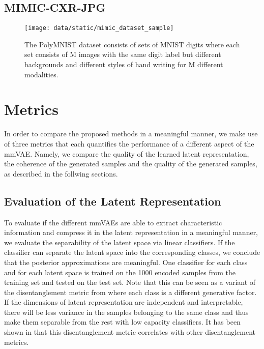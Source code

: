 \subsection{MIMIC-CXR-JPG}

\begin{figure}[h!]
    \centering
    \texttt{[image: data/static/mimic\_dataset\_sample]}
    \caption{The PolyMNIST dataset consists of sets of MNIST
    digits where each set consists of M images
    with the same digit label but different backgrounds
    and different styles of hand writing for M different modalities.}
    \label{fig:PolyMNIST}
\end{figure}

\section{Metrics}
In order to compare the proposed methods in a meaningful manner, we make use of three metrics that each quantifies the performance of a different aspect of the mmVAE.
Namely, we compare the quality of the learned latent representation, the coherence of the generated samples and the quality of the generated samples, as described in the follwing sections.

\subsection{Evaluation of the Latent Representation}
To evaluate if the different mmVAEs are able to extract characteristic information and compress it in the latent representation in a meaningful manner, we evaluate the separability of the latent space via linear classifiers.
If the classifier can separate the latent space into the corresponding classes, we conclude that the posterior approximations are meaningful.
One classifier for each class and for each latent space is trained on the 1000 encoded samples from the training set and tested on the test set.
Note that this can be seen as a variant of the disentanglement metric from \cite{beta_vae} where each class is a different generative factor.
If the dimensions of latent representation are independent and interpretable, there will be less variance in the samples belonging to the same class and thus make them separable from the rest with low capacity classifiers.
It has been shown in \cite{locatello_challenging_2019} that this disentanglement metric correlates with other disentanglement metrics.

